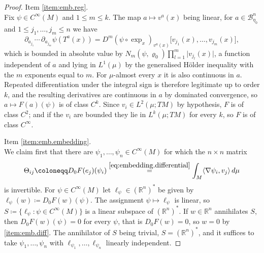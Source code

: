 \documentclass[11pt,reqno]{amsart}
\theoremstyle{plain}
\theoremstyle{definition}
\newcommand{\R}{\mathbb{R}}
\begin{document}
\begin{proof}
    \medskip
    \noindent Item \ref{item:emb.reg}.\\
    Fix \( \psi\in C^\infty(M) \) and \( 1\le m\le k \).
    The map \( a\mapsto v^a(x) \) being linear, for \( a\in\mathcal B^n_{\eta_0} \) and \( 1\le j_1,\dots,j_m\le n \) we have
    \[
        \partial_{a_{j_1}}\!\cdots\,\partial_{a_{j_m}}\psi\left(T^a(x)\right)
        =D^m(\psi\circ\exp_x)_{v^a(x)}\big[v_{j_1}(x),\dots,v_{j_m}(x)\big] ,
    \]
    which is bounded in absolute value by \( N_m(\psi,\varrho_0)\prod_{l=1}^m\lvert v_{j_l}(x)\rvert \), a function independent of \( a \) and lying in \( L^1(\mu) \) by the generalised Hölder inequality with the \( m \) exponents equal to \( m \).
    For \( \mu \)-almost every \( x \) it is also continuous in \( a \).
    Repeated differentiation under the integral sign is therefore legitimate up to order \( k \), and the resulting derivatives are continuous in \( a \) by dominated convergence, so \( a\mapsto F(a)(\psi) \) is of class \( C^k \).
    Since \( v_i\in L^2(\mu;TM) \) by hypothesis, \( F \) is of class \( C^2 \); and if the \( v_i \) are bounded they lie in \( L^k(\mu;TM) \) for every \( k \), so \( F \) is of class \( C^\infty \).

    \medskip
    \noindent Item \ref{item:emb.embedding}.\\
    We claim first that there are \( \psi_1,\dots,\psi_n\in C^\infty(M) \) for which the \( n\times n \) matrix
    \[
        \Theta_{ij}\coloneqq D_0F(e_j)(\psi_i)\overset{\eqref{eq:embedding.differential}}{=}\int_M\langle\nabla\psi_i,v_j\rangle\,d\mu
    \]
    is invertible.
    For \( \psi\in C^\infty(M) \) let \( \ell_\psi\in(\R^n)^\ast \) be given by \( \ell_\psi(w)\coloneqq D_0F(w)(\psi) \).
    The assignment \( \psi\mapsto\ell_\psi \) is linear, so \( S\coloneqq\{\ell_\psi:\psi\in C^\infty(M)\} \) is a linear subspace of \( (\R^n)^\ast \).
    If \( w\in\R^n \) annihilates \( S \), then \( D_0F(w)(\psi)=0 \) for every \( \psi \), that is \( D_0F(w)=0 \), so \( w=0 \) by \ref{item:emb.diff}.
    The annihilator of \( S \) being trivial, \( S=(\R^n)^\ast \), and it suffices to take \( \psi_1,\dots,\psi_n \) with \( \ell_{\psi_1},\dots,\ell_{\psi_n} \) linearly independent.


\end{proof}
\end{document}
